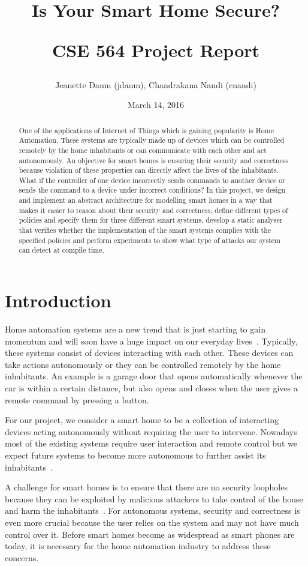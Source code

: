 \documentclass{article}
\title{\textbf{Is Your Smart Home Secure?} 
\\
\begin{center}
\LARGE{CSE 564 Project Report}
\end{center}\vspace{-2ex}}
\author{Jeanette Daum (jdaum), Chandrakana Nandi (cnandi) }
\date{March 14, 2016}
\begin{document}
\maketitle
\begin{abstract}
One of the applications of Internet of Things which is gaining popularity is Home Automation. These systems are typically made up of devices which can be controlled remotely by the home inhabitants or can communicate with each other and act autonomously. An objective for smart homes is ensuring their security and correctness because violation of these properties can directly affect the lives of the inhabitants. What if the controller of one device incorrectly sends commands to another device or sends the command to a device under incorrect conditions? In this project, we design and implement an abstract architecture for modelling smart homes in a way that makes it easier to reason about their security and correctness, define different types of policies and specify them for three different smart systems, develop a static analyser that verifies whether the implementation of the smart systems complies with the specified policies and perform experiments to show what type of attacks our system can detect at compile time. 

\end{abstract}
\section{Introduction}
Home automation systems are a new trend that is just starting to gain momentum and will soon have a huge impact on our everyday lives~\cite{samsung, homekit, echo, wink, homeos}. Typically, these systems consist of devices interacting with each other. These devices can take actions autonomously or they can be controlled remotely by the home inhabitants. An example is a garage door that opens automatically whenever the car is within a certain distance, but also opens and closes when the user gives a remote command by pressing a button. 

For our project, we consider a smart home to be a collection of interacting devices acting autonomously without requiring the user to intervene. Nowadays most of the existing systems require user interaction and remote control but we expect future systems to become more autonomous to further assist its inhabitants~\cite{homekit}.

A challenge for smart homes is to ensure that there are no security loopholes because they can be exploited by malicious attackers to take control of the house and harm the inhabitants~\cite{yoshi, jung}. For autonomous systems, security and correctness is even more crucial because the user relies on the system and may not have much control over it. Before smart homes become as widespread as smart phones are today, it is necessary for the home automation industry to address these concerns.
\end{document}
